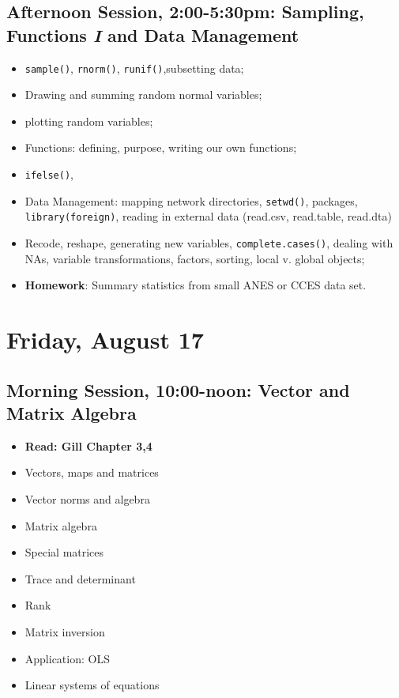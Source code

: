 \documentclass[12pt,a4paper]{article}
\begin{document}
\subsection*{Afternoon Session, 2:00-5:30pm: Sampling, Functions \emph{I} and Data Management}
\begin{itemize}
\setlength{\itemsep}{0pt}
\footnotesize
\item \texttt{sample()}, \texttt{rnorm()}, \texttt{runif()},subsetting data;
\item Drawing and summing random normal variables;
\item plotting random variables;
\item Functions: defining, purpose, writing our own functions;
\item \texttt{ifelse()},
\item Data Management: mapping network directories, \texttt{setwd()}, packages, \texttt{library(foreign)}, reading in external data (read.csv, read.table, read.dta)
\item Recode, reshape, generating new variables, \texttt{complete.cases()}, dealing with NAs, variable transformations, factors, sorting, local v. global objects;
\item \textbf{Homework}: Summary statistics from small ANES or CCES data set.
\end{itemize}



\section*{Friday, August 17}
\subsection*{Morning Session, 10:00-noon: Vector and Matrix Algebra}
\begin{itemize}
\setlength{\itemsep}{0pt}
\footnotesize
\item \textbf{Read: Gill Chapter 3,4}
\item Vectors, maps and matrices
\item Vector norms and algebra
\item Matrix algebra
\item Special matrices
\item Trace and determinant
\item Rank
\item Matrix inversion
\item Application: OLS
\item Linear systems of equations


\end{itemize}
\end{document}
